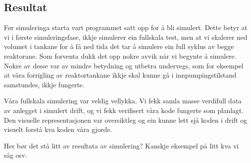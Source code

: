 \subsection{Resultat}


Før simuleringa starta vart programmet satt opp for å bli simulert. 
Dette betyr at vi i første simuleringsfase, ikkje simulerer ein fullskala test, men at vi skalerer ned volumet i tankane 
for å få ned tida det tar å simulere ein full syklus av begge reaktorane. 
Som forventa dukk det opp nokre avvik når vi begynte å simulere. 
Nokre av desse var av mindre betydning og utbetra  undervegs, som for eksempel at våra forrigling av reaktortankane ikkje skal 
kunne gå i innpumpingstilstand samstundes, ikkje fungerte.

Våra fullskala simulering var veldig vellykka. 
Vi fekk samla masse verdifull data av anlegget i simulert drift, og vi fekk verifisert våra kode fungerte som planlagt. 
Den visuelle representasjonen var oversiktleg og ein kunne lett sjå koden i drift og visuelt forstå kva koden våra gjorde.      


Her bør det stå litt av resultata av simulering? \newline
Kanskje eksempel på litt kva vi såg osv.\newline

